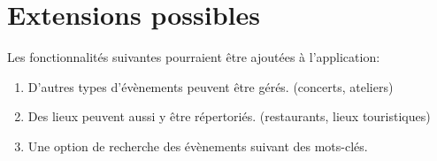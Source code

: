 \documentclass[11pt,a4paper,margin=0.5in]{report}
\begin{document}
\section{Extensions possibles}
Les fonctionnalités suivantes pourraient être ajoutées à l'application:
\begin{enumerate}
    \item D'autres types d'évènements peuvent être gérés. (concerts, ateliers)
    \item Des lieux peuvent aussi y être répertoriés. (restaurants, lieux touristiques)
    \item Une option de recherche des évènements suivant des mots-clés.
\end{enumerate}
\end{document}
